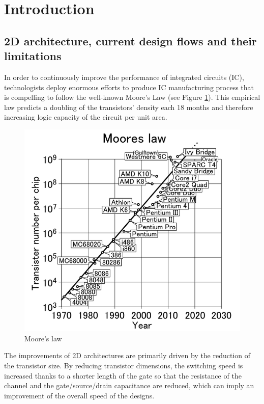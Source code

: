 \chapter*{Introduction}
\fancyhead[LO]{} 

\section*{2D architecture, current design flows and their limitations}
In order to continuously improve the performance of integrated circuits (IC), technologists deploy enormous efforts to produce IC manufacturing process that is compelling to follow the well-known Moore's Law (see Figure \ref{fig:mooreslaw}). This empirical law predicts a doubling of the transistors' density each 18 months and therefore increasing logic capacity of the circuit per unit area. 

\begin{figure}
\begin{center}
\includegraphics[width=0.7\linewidth]{mooreslaw.png}
\end{center}
\vspace{-0.5cm}
\caption{Moore's law \cite{mooreslawpic}}
\label{fig:mooreslaw}
\end{figure}

The improvements of 2D architectures are primarily driven by the reduction of the transistor size. By reducing transistor dimensions, the switching speed is increased thanks to a shorter length of the gate so that the resistance of the channel and the gate/source/drain capacitance are reduced, which can imply an improvement of the overall speed of the designs.


